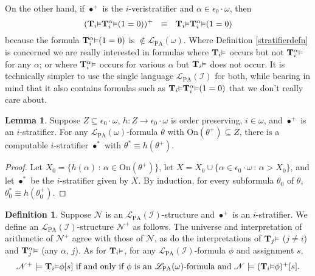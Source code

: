 \documentclass[reqno]{article}
\theoremstyle{definition}
\newtheorem{lemma}[theorem]{Lemma}
\newtheorem{definition}[theorem]{Definition}
\def\L{\mathscr{L}}
\def\T{\mathbf{T}}
\def\LPA{\L_{\mathrm{PA}}}
\def\epom{\epsilon_0\cdot\omega}
\def\indset{\mathcal I}
\def\onset{\mathrm{On}}
\renewcommand{\Pr}[1]{\T_{#1}\mbox{\small${\vDash}$}}
\newcommand{\Prr}[2]{\T^{#1}_{#2}\mbox{\small${\vDash}$}}
\begin{document}
On the other hand, if $\bullet^+$ is the $i$-veristratifier and $\alpha\in\epom$, then
\[(\Pr i \Prr \alpha i (1=0))^+ \,\,\,\,\equiv\,\,\,\,
\Pr i \Prr \alpha i (1=0)\]
because the formula $\Prr \alpha i (1=0)$ is $\not\in \LPA(\omega)$.
Where Definition \ref{stratifierdefn} is concerned
we are really interested in formulas where $\Pr i$ occurs but not
$\Prr \alpha i$ for any $\alpha$; or where $\Prr \alpha i$ occurs for
various $\alpha$ but $\Pr i$ does not occur.  It is technically simpler
to use the single language $\LPA(\indset)$ for both, while bearing in
mind that it also contains formulas such as $\Pr i \Prr\alpha i(1=0)$
that we don't really care about.

\begin{lemma}
\label{stratifiermagic}
Suppose $Z\subseteq\epom$,
$h:Z\to \epom$ is order preserving, $i\in\omega$,
and $\bullet^+$ is an $i$-stratifier.
For any $\LPA(\omega)$-formula $\theta$ with $\onset(\theta^+)\subseteq Z$,
there is a computable $i$-stratifier $\bullet^*$ with $\theta^*\equiv h(\theta^+)$.
\end{lemma}

\begin{proof}
Let $X_0=\{h(\alpha)\,:\,\alpha\in\onset(\theta^+)\}$,
let $X=X_0\cup\{\alpha\in\epom\,:\,\alpha>X_0\}$,
and let $\bullet^*$ be the $i$-stratifier given by $X$.
By induction, for every subformula $\theta_0$ of $\theta$, $\theta^*_0\equiv h(\theta^+_0)$.
\end{proof}


\begin{definition}
\label{moduloidefn}
Suppose $\mathscr N$ is an $\LPA(\indset)$-structure
and $\bullet^+$ is an $i$-stratifier.
We define an $\LPA(\indset)$-structure $\mathscr N^+$
as follows.
The universe and interpretation of arithmetic of $\mathscr N^+$
agree with those of $\mathscr N$,
as do the interpretations of $\Pr j$ ($j\not=i$) and $\Prr\alpha j$ (any $\alpha$, $j$).
As for $\Pr i$,
for any $\LPA(\indset)$-formula $\phi$ and assignment $s$,
\[
\mbox{$\mathscr N^+ \models \Pr i\phi[s]$
 if and only if $\phi$ is an $\LPA(\omega)$-formula and $\mathscr N\models (\Pr i\phi)^+[s]$.}
\]
\end{definition}
\end{document}
